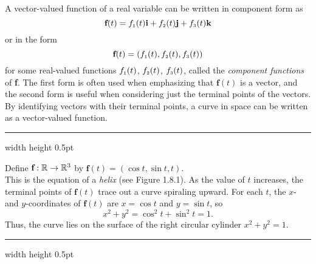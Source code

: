 A vector-valued function of a real variable can be written in component form as
\begin{displaymath}
 \textbf{f}(t) = f_{\scriptscriptstyle 1}(t) \textbf{i} + f_{\scriptscriptstyle 2}(t) \textbf{j} + f_{\scriptscriptstyle 3}(t) \textbf{k}
\end{displaymath}
or in the form
\begin{displaymath}
 \textbf{f}(t) = ( f_{\scriptscriptstyle 1}(t),f_{\scriptscriptstyle 2}(t),f_{\scriptscriptstyle 3}(t) )
\end{displaymath}
for some real-valued functions $f_{\scriptscriptstyle 1}(t)$, $f_{\scriptscriptstyle 2}(t)$, $f_{\scriptscriptstyle 3}(t)$, called the \emph{component 
functions} of \textbf{f}. The first form is often used when emphasizing that $\textbf{f}(t)$ is a vector, and the
second form is useful when considering just the terminal points of the vectors.
By identifying vectors with their terminal points, a curve in space can be written as a vector-valued function.

\vspace{2mm}
\hrule width \textwidth height 0.5pt
\piccaption[]{}
\begin{exmp}
 Define $\textbf{f}: \mathbb{R} \rightarrow \mathbb{R}^{3}$ by $\textbf{f}(t) = ( \cos t , \sin t , t )$.\\ This is
 the equation of a \emph{helix} (see Figure 1.8.1). As the value of $t$ increases, the terminal points of
 $\textbf{f}(t)$ trace out a curve spiraling upward. For each $t$, the $x$- and $y$-coordinates of $\textbf{f}(t)$
 are $x = \cos t$ and $y = \sin t$, so
 \begin{displaymath}
 x^2 + y^2 = \cos^2 t + \sin^2 t = 1.
 \end{displaymath}
 Thus, the curve lies on the surface of the right circular cylinder $x^2 + y^2 = 1$.
\end{exmp}
\hrule width \textwidth height 0.5pt
\vspace{2mm}

